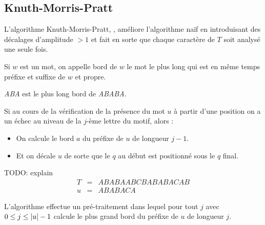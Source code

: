 \subsection{Knuth-Morris-Pratt}


L'algorithme Knuth-Morris-Pratt, \cite{kmp}, améliore l'algorithme naïf en introduisant des décalages d'amplitude
$> 1$ et fait en sorte que chaque caractère de $T$ soit analysé une seule fois.

\iffalse
	\begin{itemize}
		\item Amélioration par rapport à l'algorithme naïf:

		      L'algorithme ne prend en considération que certains décalages
		      pour le motif en excluant les décalages où on ne pourra pas trouver le motif.
	\end{itemize}
\fi


\begin{definition}
	Si $w$ est un mot, on appelle bord de $w$ le mot le plus long qui est en même temps préfixe et suffixe de $w$ et propre.
\end{definition}

\begin{exemple}
	\emph{ABA} est le plus long bord de \emph{ABABA}.
\end{exemple}

Si au cours de la vérification de la présence du mot $u$ à partir d'une position
on a un échec au niveau de la $j$-ème lettre du motif, alors :

\begin{itemize}
	\item On calcule le bord $a$ du préfixe de $u$ de longueur $j-1$.
	\item Et on décale $u$ de sorte que le $q$ au début est positionné sous le $q$ final.
\end{itemize}

\begin{exemple}
	TODO: explain
	\begin{eqnarray*}
		T &=& ABABAABCBABABACAB \\
		u &=& ABABACA
	\end{eqnarray*}
\end{exemple}


L'algorithme effectue un pré-traitement dans lequel pour tout $j$ avec $0 \leq j \leq |u| - 1$
calcule le plus grand bord du préfixe de $u$ de longueur $j$.

